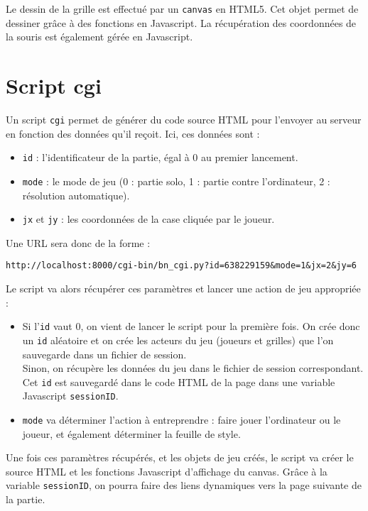 Le dessin de la grille est effectué par un \texttt{canvas} en HTML5. Cet objet permet de dessiner grâce à des fonctions en Javascript. La récupération des coordonnées de la souris est également gérée en Javascript.

\section{Script cgi}
Un script \texttt{cgi} permet de générer du code source HTML pour l'envoyer au serveur en fonction des données qu'il reçoit. Ici, ces données sont :
\begin{itemize}
\item \texttt{id} : l'identificateur de la partie, égal à 0 au premier lancement.
\item \texttt{mode} : le mode de jeu (0 : partie solo, 1 : partie contre l'ordinateur, 2 : résolution automatique).
\item \texttt{jx} et \texttt{jy} : les coordonnées de la case cliquée par le joueur. 
\end{itemize}
Une URL sera donc de la forme :
\begin{center}
\texttt{http://localhost:8000/cgi-bin/bn\_cgi.py?id=638229159\&mode=1\&jx=2\&jy=6}
\end{center}

\medskip

Le script va alors récupérer ces paramètres et lancer une action de jeu appropriée : 
\begin{itemize}
\item Si l'\texttt{id} vaut 0, on vient de lancer le script pour la première fois. On crée donc un \texttt{id} aléatoire et on crée les acteurs du jeu (joueurs et grilles) que l'on sauvegarde dans un fichier de session.\\
Sinon, on récupère les données du jeu dans le fichier de session correspondant.\\
Cet \texttt{id} est sauvegardé dans le code HTML de la page dans une variable Javascript \texttt{sessionID}.
\item \texttt{mode} va déterminer l'action à entreprendre : faire jouer l'ordinateur ou le joueur, et également déterminer la feuille de style.
\end{itemize}

\medskip

Une fois ces paramètres récupérés, et les objets de jeu créés, le script va créer le source HTML et les fonctions Javascript d'affichage du canvas. Grâce à la variable \texttt{sessionID}, on pourra faire des liens dynamiques vers la page suivante de la partie. 

